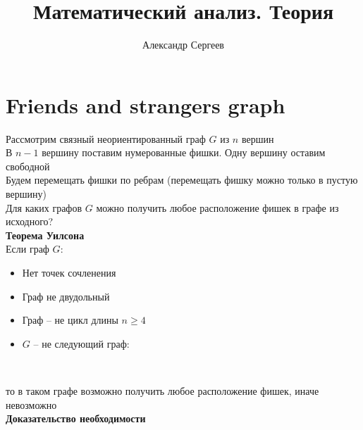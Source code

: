 \documentclass[12pt]{article}
\title{Математический анализ. Теория}
\author{Александр Сергеев}
\date{}
\begin{document}
\maketitle
\section{Friends and strangers graph}
Рассмотрим связный неориентированный граф $G$ из $n$ вершин\\
В $n-1$ вершину поставим нумерованные фишки. Одну вершину оставим свободной\\
Будем перемещать фишки по ребрам (перемещать фишку можно только в пустую вершину)\\
Для каких графов $G$ можно получить любое расположение фишек в графе из исходного?\\
\textbf{Теорема Уилсона}\\
Если граф $G$:
\begin{itemize}
    \item Нет точек сочленения
    \item Граф не двудольный
    \item Граф -- не цикл длины $n\geq 4$
    \item $G$ -- не следующий граф:\\
    \\
\end{itemize}
то в таком графе возможно получить любое расположение фишек, иначе невозможно\\
\textbf{Доказательство необходимости}
\end{document}
